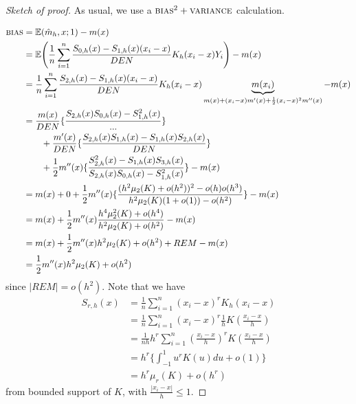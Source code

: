 \begin{proof}[Sketch of proof]
  As usual, we use a $\textsc{bias}^{2} + \textsc{variance}$
  calculation.

  \begin{align}
    \label{eq:60}
    \textsc{bias} &= \E{\hat m_{h}, x; 1} - m(x) \\
    &= \E{\frac{1}{n} \sum_{i=1}^{n} \frac{S_{0, h}(x) - S_{1,
          h}(x)(x_{i} - x)}{DEN} K_{h}(x_{i} - x) Y_{i}} - m(x) \\
    &= \frac{1}{n} \sum_{i=1}^{n} \frac{S_{2, h}(x) - S_{1,
        h}(x)(x_{i} - x)}{DEN} K_{h}(x_{i} - x)
    \underbrace{m(x_{i})}_{m(x) + (x_{i} - x) m'(x) + \frac{1}{2}
      (x_{i} - x)^{2} m''(x)} - m(x) \\
    &= \frac{m(x)}{DEN} \{ \frac{S_{2, h}(x) S_{0, h}(x) - S_{1,
        h}^{2}(x)}{...} \} \\
    &\qquad + \frac{m'(x)}{DEN} \{ \frac{S_{2, h}(x)
      S_{1, h}(x) - S_{1, h}(x) S_{2, h}(x)}{DEN} \} \\
    \label{eq:139}
    &\qquad + \frac{1}{2}
    m''(x) \{ \frac{S_{2, h}^{2}(x) - S_{1, h}(x) S_{3, h}(x)}{S_{2,
        h}(x) S_{0, h}(x) - S_{1, h}^{2}(x)} \} - m(x) \\
    &= m(x) + 0 + \frac{1}{2} m''(x) \{ \frac{(h^{2} \mu_{2}(K) +
      o(h^{2}))^{2} - o(h) o(h^{3})}{h^{2} \mu_{2}(K)(1 + o(1)) -
      o(h^{2})} \} - m(x) \\
    &= m(x) + \frac{1}{2} m''(x) \frac{h^{4} \mu_{2}^{2}(K) +
      o(h^{4})}{h^{2} \mu_{2}(K) + o(h^{2})} - m(x) \\
    &= m(x) + \frac{1}{2} m''(x) h^{2} \mu_{2}(K) + o(h^{2}) + REM -
    m(x) \\
    &= \frac{1}{2} m''(x) h^{2} \mu_{2}(K) + o(h^{2})
  \end{align} since $|REM| = o(h^{2})$.
  Note that we  have
  \begin{align}
    \label{eq:61}
    S_{r, h}(x) &= \frac{1}{n} \sum_{i=1}^{n} (x_{i} - x)^{r}
    K_{h}(x_{i} - x) \\
    &= \frac{1}{n} \sum_{i=1}^{n}  (x_{i} - x)^{r} \frac{1}{h}
    K(\frac{x_{i} - x}{h}) \\
    &= \frac{1}{nh} h^{r} \sum_{i=1}^{n} (\frac{x_{i} - x}{h})^{r}
    K(\frac{x_{i} - x}{h})  \\
    &= h^{r} \{ \int_{-1}^{1} u^{r} K(u) du + o(1) \} \\
    &= h^{r} \mu_{r}(K) + o(h^{r})
  \end{align} from bounded support of $K$, with $\frac{|x_{i} - x|}{h}
  \leq 1$.



\end{proof}
